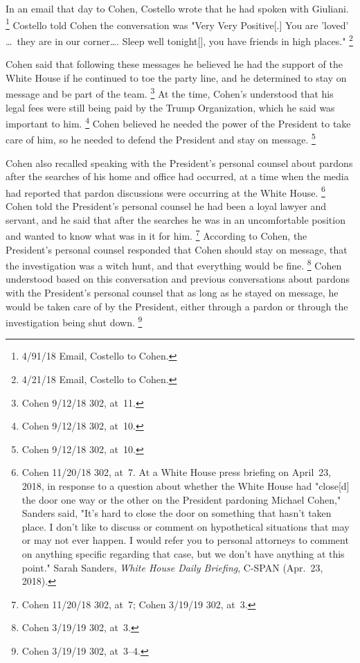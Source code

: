 In an email that day to Cohen, Costello wrote that he had spoken with Giuliani.%
\footnote{4/91/18 Email, Costello to Cohen.}
Costello told Cohen the conversation was "Very Very Positive[.] You are 'loved' \dots\ they are in our corner\dots. Sleep well tonight[], you have friends in high places."%
\footnote{4/21/18 Email, Costello to Cohen. }

Cohen said that following these messages he believed he had the support of the White House if he continued to toe the party line, and he determined to stay on message and be part of the team.%
\footnote{Cohen 9/12/18 302, at~11.}
At the time, Cohen's understood that his legal fees were still being paid by the Trump Organization, which he said was important to him.%
\footnote{Cohen 9/12/18 302, at~10.}
Cohen believed he needed the power of the President to take care of him, so he needed to defend the President and stay on message.%
\footnote{Cohen 9/12/18 302, at~10.}

Cohen also recalled speaking with the President's personal counsel about pardons after the searches of his home and office had occurred, at a time when the media had reported that pardon discussions were occurring at the White House.%
\footnote{Cohen 11/20/18 302, at~7.
At a White House press briefing on April~23, 2018, in response to a question about whether the White House had "close[d] the door one way or the other on the President pardoning Michael Cohen," Sanders said, "It's hard to close the door on something that hasn't taken place.
I don't like to discuss or comment on hypothetical situations that may or may not ever happen.
I would refer you to personal attorneys to comment on anything specific regarding that case, but we don't have anything at this point."
Sarah Sanders, \textit{White House Daily Briefing}, C-SPAN (Apr.~23, 2018).}
Cohen told the President's personal counsel he had been a loyal lawyer and servant, and he said that after the searches he was in an uncomfortable position and wanted to know what was in it for him.%
\footnote{Cohen 11/20/18 302, at~7;
Cohen 3/19/19 302, at~3.}
According to Cohen, the President's personal counsel responded that Cohen should stay on message, that the investigation was a witch hunt, and that everything would be fine.%
\footnote{Cohen 3/19/19 302, at~3.}
Cohen understood based on this conversation and previous conversations about pardons with the President's personal counsel that as long as he stayed on message, he would be taken care of by the President, either through a pardon or through the investigation being shut down.%
\footnote{Cohen 3/19/19 302, at~3--4.}

